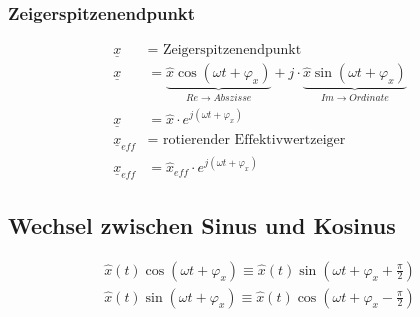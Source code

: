 \subsubsection*{Zeigerspitzenendpunkt}
\begin{align*}
\underline{x} &= \text{ Zeigerspitzenendpunkt}\\
\underline{x} &= \underbrace{\hat{x}\cos\left(\omega t + \varphi_{x}\right)}_{Re \rightarrow Abszisse} + j \cdot
\underbrace{\hat{x}\sin\left(\omega t + \varphi_{x}\right)}_{Im \rightarrow Ordinate} \\
\underline{x} &= \hat{x} \cdot e^{j \left( \omega t + \varphi_x \right)} \\
\underline{x}_{eff} &= \text{ rotierender Effektivwertzeiger} \\
\underline{x}_{eff} &= \hat{x}_{eff} \cdot e^{j \left( \omega t + \varphi_x \right)} 
\end{align*}

\subsection{Wechsel zwischen Sinus und Kosinus}
\begin{align*}
\hat{x}\left(t\right)\cos\left(\omega t + \varphi_x\right) \equiv \hat{x}\left(t\right)\sin\left(\omega t + \varphi_x + \frac{\pi}{2}\right) \\
\hat{x}\left(t\right)\sin\left(\omega t + \varphi_x\right) \equiv \hat{x}\left(t\right)\cos\left(\omega t + \varphi_x - \frac{\pi}{2}\right)
\end{align*}

